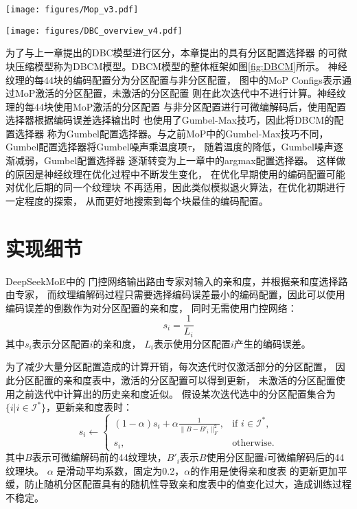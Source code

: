 \begin{figure*}[htbp]
    \centering
    \texttt{[image: figures/Mop\_v3.pdf]}
    \caption{基于混合专家模型的分区配置选择器(MoP)}
    \label{fig:Mop}
\end{figure*}

\begin{figure*}[htbp]
    \centering
    \texttt{[image: figures/DBC\_overview\_v4.pdf]}
    \caption{基于MoP的DBCM模型的整体框架}
    \label{fig:DBCM}
\end{figure*}

为了与上一章提出的DBC模型进行区分，本章提出的具有分区配置选择器
的可微块压缩模型称为DBCM模型。DBCM模型的整体框架如图\ref{fig:DBCM}所示。
神经纹理的每4\times4块的编码配置分为分区配置与非分区配置，
图中的MoP Configs表示通过MoP激活的分区配置，未激活的分区配置
则在此次迭代中不进行计算。神经纹理的每4\times4块使用MoP激活的分区配置
与非分区配置进行可微编解码后，使用配置选择器根据编码误差选择输出时
也使用了Gumbel-Max技巧，因此将DBCM的配置选择器
称为Gumbel配置选择器。与之前MoP中的Gumbel-Max技巧不同，
Gumbel配置选择器将Gumbel噪声乘温度项$\tau$，
随着温度的降低，Gumbel噪声逐渐减弱，Gumbel配置选择器
逐渐转变为上一章中的argmax配置选择器。
这样做的原因是神经纹理在优化过程中不断发生变化，
在优化早期使用的编码配置可能对优化后期的同一个纹理块
不再适用，因此类似模拟退火算法，在优化初期进行一定程度的探索，
从而更好地搜索到每个块最佳的编码配置。

\section{实现细节}

DeepSeekMoE\cite{dai2024deepseekmoe}中的
门控网络输出路由专家对输入的亲和度，并根据亲和度选择路由专家，
而纹理编解码过程只需要选择编码误差最小的编码配置，因此可以使用编码误差的倒数作为对分区配置的亲和度，
同时无需使用门控网络：
\begin{equation}
s_i=\frac{1}{L_i}
\end{equation}
其中$s_i$表示分区配置$i$的亲和度，
$L_i$表示使用分区配置$i$产生的编码误差。

为了减少大量分区配置造成的计算开销，每次迭代时仅激活部分的分区配置，
因此分区配置的亲和度表中，激活的分区配置可以得到更新，
未激活的分区配置使用之前迭代中计算出的历史亲和度近似。
假设某次迭代选中的分区配置集合为$\{i|i\in\mathcal{I}^*\}$，更新亲和度表时：
\begin{equation}
    s_i\leftarrow
    \begin{cases} 
        (1-\alpha)s_i+\alpha\frac{1}{\|B-B'_i\|_F^2}, & \text{if } i\in\mathcal{I}^*,\\
    s_i, & \text{otherwise}.
    \end{cases}
\end{equation}
其中$B$表示可微编解码前的4\times4纹理块，$B'_i$表示$B$使用分区配置$i$可微编解码后的4\times4纹理块。
$\alpha$ 是滑动平均系数，固定为0.2，$\alpha$的作用是使得亲和度表
的更新更加平缓，防止随机分区配置具有的随机性导致亲和度表中的值变化过大，造成训练过程不稳定。

